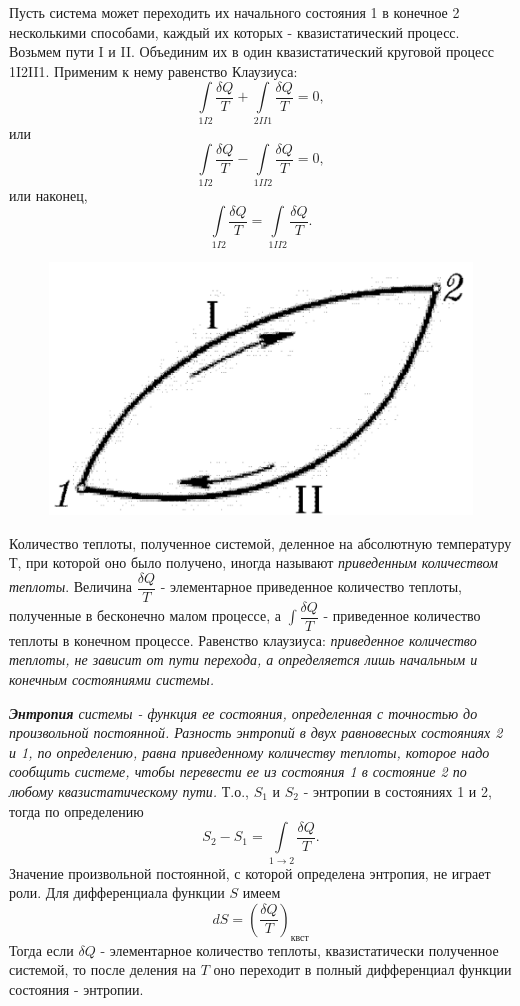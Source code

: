 \documentclass[14pt,a4paper]{scrartcl}
\begin{document}
	\quad Пусть система может переходить их начального состояния 1 в конечное 2 несколькими способами, каждый их которых - квазистатический процесс. Возьмем пути I и II. Объединим их в один квазистатический круговой процесс 1I2II1. Применим к нему равенство Клаузиуса: $$\int\limits_{1 I 2} \dfrac{\delta Q}{T} +\int\limits_{2 II 1} \dfrac{\delta Q}{T} = 0,$$ или  $$\int\limits_{1 I 2} \dfrac{\delta Q}{T} - \int\limits_{1 II 2} \dfrac{\delta Q}{T} = 0,$$ или наконец, $$\int\limits_{1 I 2} \dfrac{\delta Q}{T} = \int\limits_{1 II 2} \dfrac{\delta Q}{T} .$$
	\begin{figure} 
		\includegraphics[width=\linewidth]{entropy.png}
	\end{figure}

	\quad Количество теплоты, полученное системой, деленное на абсолютную температуру $Т$, при которой оно было получено, иногда называют \textit{приведенным количеством теплоты}. Величина $\dfrac{\delta Q}{T}$ - элементарное приведенное количество теплоты, полученные в бесконечно малом процессе, а $\int \dfrac{\delta Q}{T}$ - приведенное количество теплоты в конечном процессе. Равенство клаузиуса: \textit{приведенное количество теплоты, не зависит от пути перехода, а определяется лишь начальным и конечным состояниями системы.}
	
	\quad \textit{\textbf{Энтропия} системы - функция ее состояния, определенная с точностью до произвольной постоянной. Разность энтропий в двух равновесных состояниях 2 и 1, по определению, равна приведенному количеству теплоты, которое надо сообщить системе, чтобы перевести ее из состояния 1 в состояние 2 по любому квазистатическому пути.} Т.о., $S_1$ и $S_2$ - энтропии в состояниях 1 и 2, тогда по определению $$S_2 - S_1 = \int\limits_{1\to2} \dfrac{\delta Q}{T}.$$ Значение произвольной постоянной, с которой определена энтропия, не играет роли. Для дифференциала функции $S$ имеем $$dS = (\dfrac{\delta Q}{T})_{\text{квст}}$$ Тогда если $\delta Q$ - элементарное количество теплоты, квазистатически полученное системой, то после деления на $T$ оно переходит в полный дифференциал функции состояния - энтропии.\\
	
\end{document}
